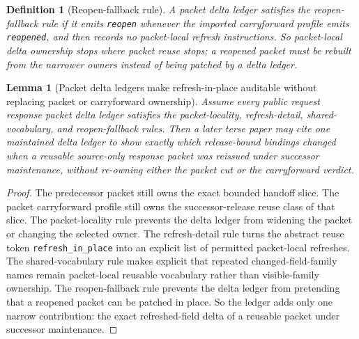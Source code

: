 \documentclass[11pt]{article}
\newtheorem{definition}{Definition}
\newtheorem{lemma}{Lemma}
\begin{document}
\begin{definition}[Reopen-fallback rule]
A packet delta ledger satisfies the \emph{reopen-fallback rule} if it emits \texttt{reopen} whenever the imported carryforward profile emits \texttt{reopened}, and then records no packet-local refresh instructions.
So packet-local delta ownership stops where packet reuse stops; a reopened packet must be rebuilt from the narrower owners instead of being patched by a delta ledger.
\end{definition}

\begin{lemma}[Packet delta ledgers make refresh-in-place auditable without replacing packet or carryforward ownership]
Assume every public request response packet delta ledger satisfies the packet-locality, refresh-detail, shared-vocabulary, and reopen-fallback rules.
Then a later terse paper may cite one maintained delta ledger to show exactly which release-bound bindings changed when a reusable source-only response packet was reissued under successor maintenance, without re-owning either the packet cut or the carryforward verdict.
\end{lemma}

\begin{proof}
The predecessor packet still owns the exact bounded handoff slice.
The packet carryforward profile still owns the successor-release reuse class of that slice.
The packet-locality rule prevents the delta ledger from widening the packet or changing the selected owner.
The refresh-detail rule turns the abstract reuse token \texttt{refresh\_in\_place} into an explicit list of permitted packet-local refreshes.
The shared-vocabulary rule makes explicit that repeated changed-field-family names remain packet-local reusable vocabulary rather than visible-family ownership.
The reopen-fallback rule prevents the delta ledger from pretending that a reopened packet can be patched in place.
So the ledger adds only one narrow contribution: the exact refreshed-field delta of a reusable packet under successor maintenance.\qedhere
\end{proof}
\end{document}

